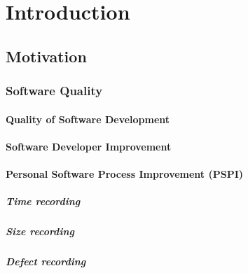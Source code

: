 
\chapter{Introduction}
\label{sec:intro}

\section{Motivation}

\subsection{Software Quality}

\subsubsection{Quality of Software Development}

\subsubsection{Software Developer Improvement}

\subsubsection{Personal Software Process Improvement (PSPI)}

\paragraph{Time recording}

\paragraph{Size recording}

\paragraph{Defect recording}

